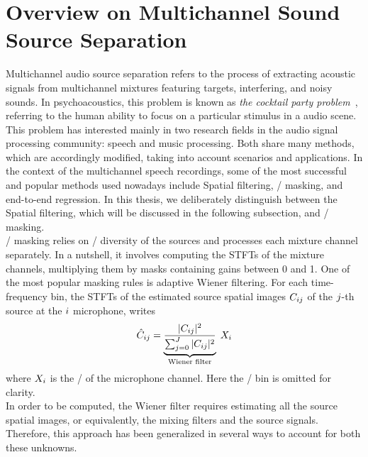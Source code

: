 \section{Overview on Multichannel Sound Source Separation}\label{subsec:application:separation}
Multichannel audio source separation refers to the process of extracting acoustic signals from multichannel mixtures featuring targets, interfering, and noisy sounds.
In psychoacoustics, this problem is known as \textit{the cocktail party problem}~, referring to the human ability to focus on a particular stimulus in a audio scene.
This problem has interested mainly in two research fields in the audio signal processing community: speech and music processing.
Both share many methods, which are accordingly modified, taking into account scenarios and applications.
In the context of the multichannel speech recordings, some of the most successful and popular methods used nowadays
include Spatial filtering, \TF/ masking, and end-to-end regression.
In this thesis, we deliberately distinguish between the Spatial filtering, which will be discussed in the following subsection, and \TF/ masking.
\\\TF/ masking relies on \TF/ diversity of the sources and processes each mixture channel separately.
In a nutshell, it involves computing the \acp{STFT} of the mixture channels, multiplying them by masks containing gains between 0 and 1.
One of the most popular masking rules is adaptive Wiener filtering.
For each time-frequency bin, the \acp{STFT} of the estimated source spatial images $C_{ij}$ of the $j$-th source at the $i$ microphone, writes
\begin{equation}
        \hat{C}_{ij} = \underbrace{\frac{|{C_{ij}}|^2}
                                        {\sum_{j=0}^{J} |{C_{ij}}|^2}}
                                        _{\text{Wiener filter}} \; X_{i}
\end{equation}
where $X_{i}$ is the \STFT/ of the microphone channel. Here the \TF/ bin is omitted for clarity.
\\In order to be computed, the Wiener filter requires estimating all the source spatial images, or equivalently, the mixing filters and the source signals.
Therefore, this approach has been generalized in several ways to account for both these unknowns.
